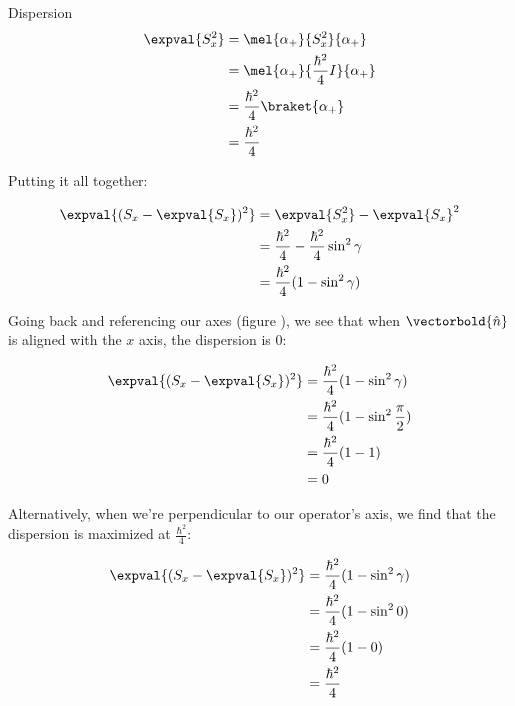 \begin{answer}
\begin{answerpart}{Dispersion}
    \begin{equation}
      \begin{split}
        \expval{S_x^2}
        &= \mel{\alpha_+}{S_x^2}{\alpha_+}\\
        &= \mel{\alpha_+}{\frac{\hbar^2}{4}I}{\alpha_+}\\
        &= \frac{\hbar^2}{4}\braket{\alpha_+}\\
        &= \frac{\hbar^2}{4}\\
      \end{split}
    \end{equation}

    Putting it all together:

    \begin{equation}
      \begin{split}
        \expval{(S_x - \expval{S_x})^2}
        &= \expval{S_x^2} - \expval{S_x}^2\\
        &= \frac{\hbar^2}{4} - \frac{\hbar^2}{4}\sin^2{\gamma}\\
        &= \frac{\hbar^2}{4}(1 - \sin^2{\gamma})\\
      \end{split}
    \end{equation}

    Going back and referencing our axes (figure ), we
    see that when $\vectorbold{\hat{n}}$ is aligned with the $x$ axis,
    the dispersion is $0$:

    \begin{equation}
      \begin{split}
        \expval{(S_x - \expval{S_x})^2}
        &= \frac{\hbar^2}{4}(1 - \sin^2{\gamma})\\
        &= \frac{\hbar^2}{4}(1 - \sin^2{\frac \pi 2})\\
        &= \frac{\hbar^2}{4}(1 - 1)\\
        &= 0\\
      \end{split}
    \end{equation}

    Alternatively, when we're perpendicular to our operator's axis, we
    find that the dispersion is maximized at $\frac{\hbar^2}{4}$:
    
    \begin{equation}
      \begin{split}
        \expval{(S_x - \expval{S_x})^2}
        &= \frac{\hbar^2}{4}(1 - \sin^2{\gamma})\\
        &= \frac{\hbar^2}{4}(1 - \sin^2{0})\\
        &= \frac{\hbar^2}{4}(1 - 0)\\
        &= \frac{\hbar^2}{4}\\
      \end{split}
    \end{equation}


\end{answerpart}
\end{answer}
